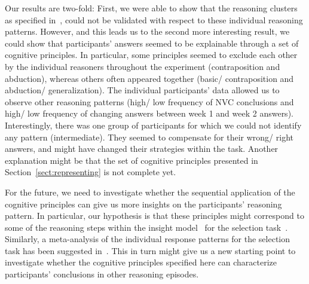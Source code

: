 \documentclass[12pt]{article}
\begin{document}
Our results are two-fold: First, we were able to show that the reasoning clusters as specified in~\cite{declare:2017}, could not be validated
with respect to these individual reasoning patterns. However, and this leads us to the second more interesting result,
we could show that participants' answers seemed to be explainable through a set of cognitive principles. In particular,
some principles seemed to exclude each other by the individual reasoners throughout the experiment (contraposition and abduction), whereas others often appeared together (basic/ contraposition and abduction/ generalization). 
The individual participants' data allowed us to observe other reasoning patterns (high/ low frequency of NVC conclusions and high/ low frequency of changing answers between week 1 and week 2 answers). 
Interestingly, there was one group of participants for which we could not identify any pattern (intermediate). 
They seemed to compensate for their wrong/ right answers, and might have changed their strategies within the task.
Another explanation might be that the set of cognitive principles presented in Section~\ref{sect:representing} is not complete yet.

For the future, we need to investigate whether the sequential application of the cognitive principles 
can give us more insights on the participants' reasoning pattern. In particular, our hypothesis is that these principles might correspond to some of the reasoning steps within the insight model~\cite{johnsonlaird:1970} for the selection task~\cite{wason:68}. Similarly, a meta-analysis of the individual response patterns for the selection task has been suggested in~\cite{ragni:2017}.
This in turn might give us a new starting point to investigate whether the cognitive principles  specified here can characterize participants' conclusions in other reasoning episodes.




\end{document}
